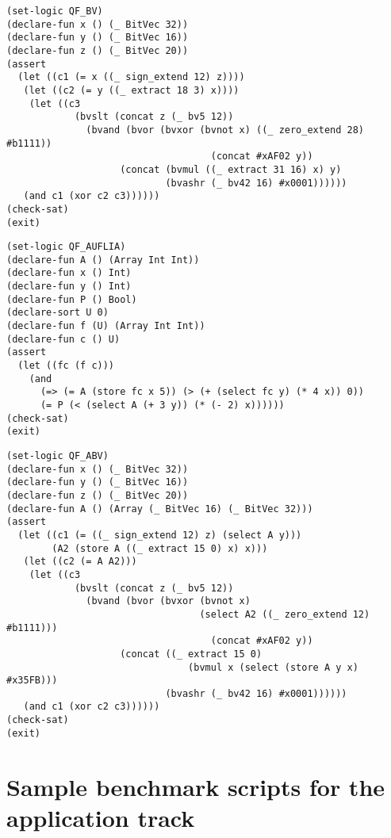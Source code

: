 \documentclass[12pt]{article}
\begin{document}

{\footnotesize
\begin{verbatim}
(set-logic QF_BV)
(declare-fun x () (_ BitVec 32))
(declare-fun y () (_ BitVec 16))
(declare-fun z () (_ BitVec 20))
(assert
  (let ((c1 (= x ((_ sign_extend 12) z))))
   (let ((c2 (= y ((_ extract 18 3) x))))
    (let ((c3 
            (bvslt (concat z (_ bv5 12)) 
              (bvand (bvor (bvxor (bvnot x) ((_ zero_extend 28) #b1111)) 
                                    (concat #xAF02 y))
                    (concat (bvmul ((_ extract 31 16) x) y) 
                            (bvashr (_ bv42 16) #x0001))))))
   (and c1 (xor c2 c3))))))
(check-sat)
(exit)
\end{verbatim}}



{\footnotesize
\begin{verbatim}
(set-logic QF_AUFLIA)
(declare-fun A () (Array Int Int))
(declare-fun x () Int)
(declare-fun y () Int)
(declare-fun P () Bool)
(declare-sort U 0)
(declare-fun f (U) (Array Int Int))
(declare-fun c () U)
(assert
  (let ((fc (f c)))
    (and
      (=> (= A (store fc x 5)) (> (+ (select fc y) (* 4 x)) 0))
      (= P (< (select A (+ 3 y)) (* (- 2) x))))))
(check-sat)
(exit)
\end{verbatim}}



\footnotesize
\begin{verbatim}
(set-logic QF_ABV)
(declare-fun x () (_ BitVec 32))
(declare-fun y () (_ BitVec 16))
(declare-fun z () (_ BitVec 20))
(declare-fun A () (Array (_ BitVec 16) (_ BitVec 32)))
(assert
  (let ((c1 (= ((_ sign_extend 12) z) (select A y)))
        (A2 (store A ((_ extract 15 0) x) x)))
   (let ((c2 (= A A2)))
    (let ((c3 
            (bvslt (concat z (_ bv5 12)) 
              (bvand (bvor (bvxor (bvnot x) 
                                  (select A2 ((_ zero_extend 12) #b1111)))
                                    (concat #xAF02 y))
                    (concat ((_ extract 15 0) 
                                (bvmul x (select (store A y x) #x35FB))) 
                            (bvashr (_ bv42 16) #x0001))))))
   (and c1 (xor c2 c3))))))
(check-sat)
(exit)
\end{verbatim}

\section{Sample benchmark scripts for the application track}
\end{document}
